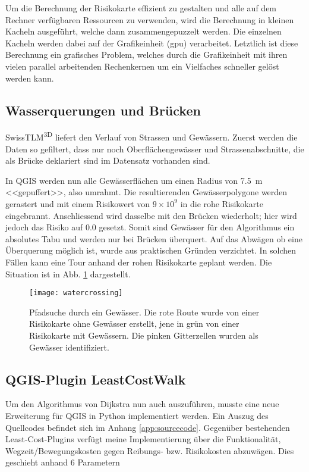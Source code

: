 Um die Berechnung der Risikokarte effizient zu gestalten und alle auf dem Rechner verfügbaren Ressourcen zu verwenden, wird die Berechnung in kleinen Kacheln ausgeführt, welche dann zusammengepuzzelt werden. Die einzelnen Kacheln werden dabei auf der Grafikeinheit (\acrshort{gpu}) verarbeitet. Letztlich ist diese Berechnung ein grafisches Problem, welches durch die Grafikeinheit mit ihren vielen parallel arbeitenden Rechenkernen um ein Vielfaches schneller gelöst werden kann.


\subsection{Wasserquerungen und Brücken}

SwissTLM\textsuperscript{3D} liefert den Verlauf von Strassen und Gewässern. Zuerst werden die Daten so gefiltert, dass nur noch Oberflächengewässer und Strassenabschnitte, die als Brücke deklariert sind im Datensatz vorhanden sind.

In QGIS werden nun alle Gewässerflächen um einen Radius von \qty{7.5}{m} <<gepuffert>>, also umrahmt. Die resultierenden Gewässerpolygone werden gerastert und mit einem Risikowert von $9 \times 10^{9}$ in die rohe Risikokarte eingebrannt. Anschliessend wird dasselbe mit den Brücken wiederholt; hier wird jedoch das Risiko auf $0.0$ gesetzt. Somit sind Gewässer für den Algorithmus ein absolutes Tabu und werden nur bei Brücken überquert. Auf das Abwägen ob eine Überquerung möglich ist, wurde aus praktischen Gründen verzichtet. In solchen Fällen kann eine Tour anhand der rohen Risikokarte geplant werden. Die Situation ist in Abb. \ref{fig:watercrossing} dargestellt.

\vfill
\begin{figure}[H]
  \centering
  \texttt{[image: watercrossing]}
  \caption{Pfadsuche durch ein Gewässer. Die rote Route wurde von einer Risikokarte ohne Gewässer erstellt, jene in grün von einer Risikokarte mit Gewässern. Die pinken Gitterzellen wurden als Gewässer identifiziert.}\label{fig:watercrossing}
\end{figure}

\pagebreak
\subsection{QGIS-Plugin LeastCostWalk}

Um den Algorithmus von Dijkstra nun auch auszuführen, musste eine neue Erweiterung für QGIS in Python implementiert werden. Ein Auszug des Quellcodes befindet sich im Anhang \ref{app:sourcecode}. Gegenüber bestehenden Least-Cost-Plugins verfügt meine Implementierung über die Funktionalität, Wegzeit/Bewegungskosten gegen Reibungs- bzw. Risikokosten abzuwägen. Dies geschieht anhand 6 Parametern 

